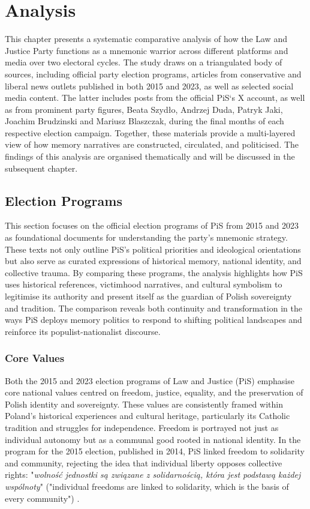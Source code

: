 \chapter[Analysis]{Analysis}
\label{Chap:Analysis}

This chapter presents a systematic comparative analysis of how the Law and Justice Party functions as a mnemonic warrior across different platforms and media over two electoral cycles. The study draws on a triangulated body of sources, including official party election programs, articles from conservative and liberal news outlets published in both 2015 and 2023, as well as selected social media content. The latter includes posts from the official PiS`s  X account, as well as from prominent party figures, Beata Szydło, Andrzej Duda, Patryk Jaki, Joachim Brudzinski and Mariusz Blaszczak, during the final months of each respective election campaign. Together, these materials provide a multi-layered view of how memory narratives are constructed, circulated, and politicised. The findings of this analysis are organised thematically and will be discussed in the subsequent chapter.

\section{Election Programs}

This section focuses on the official election programs of PiS from 2015 and 2023 as foundational documents for understanding the party's mnemonic strategy. These texts not only outline PiS's political priorities and ideological orientations but also serve as curated expressions of historical memory, national identity, and collective trauma. By comparing these programs, the analysis highlights how PiS uses historical references, victimhood narratives, and cultural symbolism to legitimise its authority and present itself as the guardian of Polish sovereignty and tradition. The comparison reveals both continuity and transformation in the ways PiS deploys memory politics to respond to shifting political landscapes and reinforce its populist-nationalist discourse.

\subsection{Core Values}

Both the 2015 and 2023 election programs of Law and Justice (PiS) emphasise core national values centred on freedom, justice, equality, and the preservation of Polish identity and sovereignty. These values are consistently framed within Poland's historical experiences and cultural heritage, particularly its Catholic tradition and struggles for independence.
Freedom is portrayed not just as individual autonomy but as a communal good rooted in national identity. In the program for the 2015 election, published in 2014, PiS linked freedom to solidarity and community, rejecting the idea that individual liberty opposes collective rights: "\textit{wolność jednostki są związane z solidarnością, która jest podstawą każdej wspólnoty}" ("individual freedoms are linked to solidarity, which is the basis of every community") \citep{pis_program_2014}.


